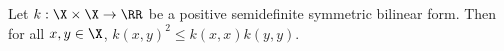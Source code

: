 Let \(k : \X \times \X \to \RR\) be a positive semidefinite symmetric bilinear form.
Then for all \(x, y \in \X\), \(k(x,y)^2 \leq k(x,x) k(y,y)\).